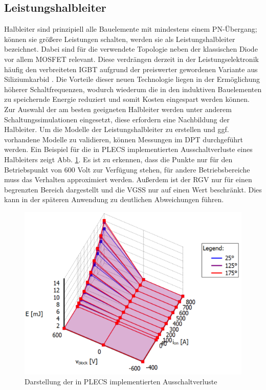 		\subsection{Leistungshalbleiter}
		Halbleiter sind prinzipiell alle Bauelemente mit mindestens einem PN-Übergang; können sie größere Leistungen schalten, werden sie als Leistungshalbleiter bezeichnet. Dabei sind für die verwendete Topologie neben der klassischen Diode vor allem \gls{MOSFET} relevant. Diese verdrängen derzeit in der Leistungselektronik häufig den verbreiteten IGBT aufgrund der preiswerter gewordenen Variante aus Siliziumkarbid \cite{SiCTrend}. Die Vorteile dieser neuen Technologie liegen in der Ermöglichung höherer Schaltfrequenzen, wodurch wiederum die in den induktiven Bauelementen zu speichernde Energie reduziert und somit Kosten eingespart werden können.\\
		Zur Auswahl der am besten geeigneten Halbleiter werden unter anderem Schaltungssimulationen eingesetzt, diese erfordern eine Nachbildung der Halbleiter. Um die Modelle der Leistungshalbleiter zu erstellen und ggf. vorhandene Modelle zu validieren, können Messungen im \gls{DPT} durchgeführt werden. Ein Beispiel für die in \gls{PLECS} implementierten Ausschaltverluste eines Halbleiters zeigt Abb. \ref{fig:plecsff2thermalmodel}. Es ist zu erkennen, dass die Punkte nur für den Betriebspunkt von 600 Volt zur Verfügung stehen, für andere Betriebsbereiche muss das Verhalten approximiert werden. Außerdem ist der \gls{RGV} nur für einen begrenzten Bereich dargestellt und die \gls{VGSS} nur auf einen Wert beschränkt. Dies kann in der späteren Anwendung zu deutlichen Abweichungen führen. 
		\begin{figure}
			\centering
			\includegraphics[width=0.7\linewidth]{content/Grafiken/PLECS_FF2ThermalModel}
			\caption{Darstellung der in PLECS implementierten Ausschaltverluste \cite{IFAGFF2}}
			\label{fig:plecsff2thermalmodel}
		\end{figure}
		

